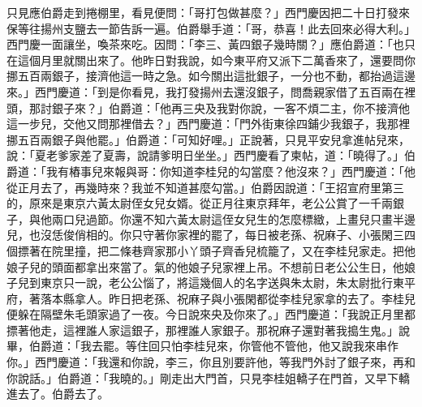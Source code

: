 只見應伯爵走到捲棚里，看見便問：「哥打包做甚麼？」西門慶因把二十日打發來保等往揚州支鹽去一節告訴一遍。伯爵舉手道：「哥，恭喜！此去回來必得大利。」西門慶一面讓坐，喚茶來吃。因問：「李三、黃四銀子幾時關？」應伯爵道：「也只在這個月里就關出來了。他昨日對我說，如今東平府又派下二萬香來了，還要問你挪五百兩銀子，接濟他這一時之急。如今關出這批銀子，一分也不動，都抬過這邊來。」西門慶道：「到是你看見，我打發揚州去還沒銀子，問喬親家借了五百兩在裡頭，那討銀子來？」伯爵道：「他再三央及我對你說，一客不煩二主，你不接濟他這一步兒，交他又問那裡借去？」西門慶道：「門外街東徐四鋪少我銀子，我那裡挪五百兩銀子與他罷。」伯爵道：「可知好哩。」正說著，只見平安兒拿進帖兒來，說：「夏老爹家差了夏壽，說請爹明日坐坐。」西門慶看了柬帖，道：「曉得了。」伯爵道：「我有樁事兒來報與哥：你知道李桂兒的勾當麼？他沒來？」西門慶道：「他從正月去了，再幾時來？我並不知道甚麼勾當。」伯爵因說道：「王招宣府里第三的，原來是東京六黃太尉侄女兒女婿。從正月往東京拜年，老公公賞了一千兩銀子，與他兩口兒過節。你還不知六黃太尉這侄女兒生的怎麼標緻，上畫兒只畫半邊兒，也沒恁俊俏相的。你只守著你家裡的罷了，每日被老孫、祝麻子、小張閑三四個摽著在院里撞，把二條巷齊家那小丫頭子齊香兒梳籠了，又在李桂兒家走。把他娘子兒的頭面都拿出來當了。氣的他娘子兒家裡上吊。不想前日老公公生日，他娘子兒到東京只一說，老公公惱了，將這幾個人的名字送與朱太尉，朱太尉批行東平府，著落本縣拿人。昨日把老孫、祝麻子與小張閑都從李桂兒家拿的去了。李桂兒便躲在隔壁朱毛頭家過了一夜。今日說來央及你來了。」西門慶道：「我說正月里都摽著他走，這裡誰人家這銀子，那裡誰人家銀子。那祝麻子還對著我搗生鬼。」說畢，伯爵道：「我去罷。等住回只怕李桂兒來，你管他不管他，他又說我來串作你。」西門慶道：「我還和你說，李三，你且別要許他，等我門外討了銀子來，再和你說話。」伯爵道：「我曉的。」剛走出大門首，只見李桂姐轎子在門首，又早下轎進去了。伯爵去了。

